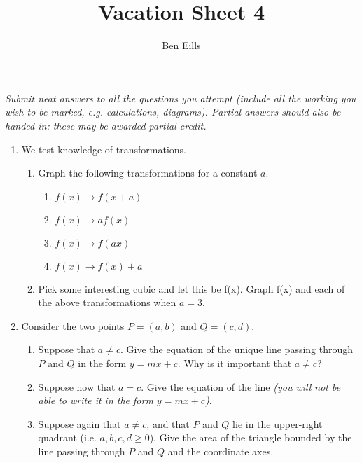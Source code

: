 \documentclass{article}
\begin{document}
\title{Vacation Sheet 4}
\author{Ben Eills}
\maketitle

\textit{Submit neat answers to all the questions you attempt (include all the working you wish to be marked, e.g. calculations, diagrams).  Partial answers should also be handed in: these may be awarded partial credit.}

\begin{enumerate}
	\item We test knowledge of transformations.
		\begin{enumerate}
			\item Graph the following transformations for a constant $a$.
			\begin{enumerate}
				\item $f(x) \longrightarrow f(x + a)$ \\
				
				\item $f(x) \longrightarrow af(x)$ \\
				
				\item $f(x) \longrightarrow f(ax)$ \\
				
				\item $f(x) \longrightarrow f(x) + a$ \\
			\end{enumerate}
			\item Pick some interesting cubic and let this be f(x).  Graph f(x) and each of the above transformations when $a=3$. 
		\end{enumerate}
	
	\item Consider the two points $P=(a, b)$ and $Q=(c, d)$.
		\begin{enumerate}
			\item Suppose that $a \ne c$.  Give the equation of the unique line passing through $P$ and $Q$ in the form $y=mx + c$.  Why is it important that $a \ne c$?

			\item Suppose now that $a = c$.  Give the equation of the line \textit{(you will not be able to write it in the form $y = mx + c$)}.
			
			\item Suppose again that $a \ne c$, and that $P$ and $Q$ lie in the upper-right quadrant (i.e. $a, b, c, d \ge 0$).  Give the area of the triangle bounded by the line passing through $P$ and $Q$ and the coordinate axes.
		\end{enumerate}



\end{enumerate}
\end{document}

